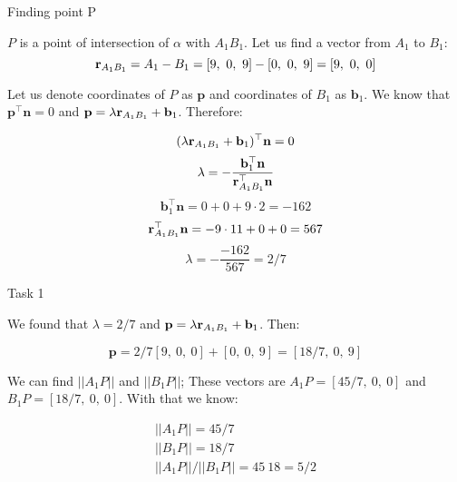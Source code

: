 \documentclass{beamer}
\begin{document}
\begin{frame}{Finding point P}
	\begin{flushleft}
		
		$P$ is a point of intersection of $\alpha$ with $A_1 B_1$. Let us find a vector from $A_1$ to $B_1$:
		\begin{equation}
			\bo{r}_{A_1 B_1} = A_1 - B_1 = [9, \ 0,  \ 9] - [0, \ 0,  \ 9] = [9, \ 0,  \ 0]
		\end{equation}
	
	Let us denote coordinates of $P$ as $\mathbf p$ and coordinates of $B_1$ as $\mathbf b_1$. We know that $\mathbf p^\top \mathbf n = 0$ and $\mathbf p = \lambda \mathbf{r}_{A_1 B_1} + \mathbf b_1$. Therefore:
	
		\begin{equation}
	(\lambda \mathbf{r}_{A_1 B_1} + \mathbf b_1)^\top \mathbf n = 0
		\end{equation}	 
		\begin{equation}
			\lambda = -\frac{ \mathbf b_1^\top \mathbf n}{\mathbf{r}_{A_1 B_1}^\top \mathbf n}
		\end{equation}
%		
\begin{equation}
	\mathbf b_1^\top \mathbf n = 0 + 0 + 9 \cdot 2 = -162
\end{equation}		
%
\begin{equation}
\mathbf{r}_{A_1 B_1}^\top \mathbf n = -9 \cdot 11 + 0 + 0 =567
\end{equation}		
%
\begin{equation}
	\lambda = -\frac{ -162 }{567} = 2/7
\end{equation}

	
	\end{flushleft}
\end{frame}



\begin{frame}{Task 1}
	\begin{flushleft}
		
We found that $\lambda = 2/7$ and $\mathbf p = \lambda \mathbf{r}_{A_1 B_1} + \mathbf b_1$. Then:

\begin{equation}
	\mathbf p =  2/7  [9, \ 0,  \ 0] +  [0, \ 0,  \ 9] = [18/7, \ 0,  \ 9] 
\end{equation}
		
		\bigskip
		
		We can find $|| A_1 P ||$ and $|| B_1 P ||$; These vectors are $A_1 P = [45/7, \ 0,  \ 0] $ and $B_1 P = [18/7, \ 0,  \ 0] $. With that we know:
		
		\begin{align}
			||A_1 P|| = 45/7 \\
			||B_1 P|| = 18/7 \\
			||A_1 P|| / ||B_1 P|| = 45 \ 18 = 5/2
		\end{align}
		
	\end{flushleft}
\end{frame}
\end{document}
